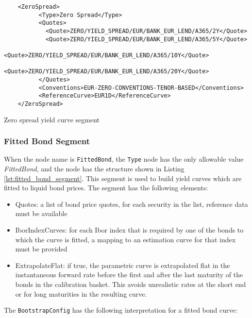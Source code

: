 \begin{listing}[H]
\begin{verbatim}
    <ZeroSpread>
          <Type>Zero Spread</Type>
          <Quotes>
            <Quote>ZERO/YIELD_SPREAD/EUR/BANK_EUR_LEND/A365/2Y</Quote>
            <Quote>ZERO/YIELD_SPREAD/EUR/BANK_EUR_LEND/A365/5Y</Quote>
            <Quote>ZERO/YIELD_SPREAD/EUR/BANK_EUR_LEND/A365/10Y</Quote>
            <Quote>ZERO/YIELD_SPREAD/EUR/BANK_EUR_LEND/A365/20Y</Quote>
          </Quotes>
          <Conventions>EUR-ZERO-CONVENTIONS-TENOR-BASED</Conventions>
          <ReferenceCurve>EUR1D</ReferenceCurve>
    </ZeroSpread>
\end{verbatim}
\caption{Zero spread yield curve segment}
\label{lst:zero_spread_segment}
\end{listing}


\subsubsection*{Fitted Bond Segment}
\label{sec:fitted_bond_segment}

When the node name is \lstinline!FittedBond!, the \lstinline!Type! node has the only allowable value \emph{FittedBond},
and the node has the structure shown in Listing \ref{lst:fitted_bond_segment}. This segment is used to build yield
curves which are fitted to liquid bond prices. The segment has the following elements:

\begin{itemize}
\item Quotes: a list of bond price quotes, for each security in the list, reference data must be available
\item IborIndexCurves: for each Ibor index that is required by one of the bonds to which the curve is fitted, a mapping
  to an estimation curve for that index must be provided
\item ExtrapolateFlat: if true, the parametric curve is extrapolated flat in the instantaneous forward rate before the
  first and after the last maturity of the bonds in the calibration basket. This avoids unrealistic rates at the short
  end or for long maturities in the resulting curve.
\end{itemize}

The \lstinline!BootstrapConfig! has the following interpretation for a fitted bond curve:

